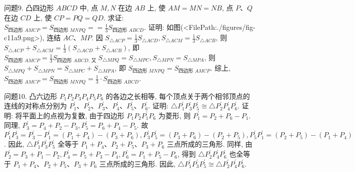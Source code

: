 问题9. 凸四边形 $A B C D$ 中, 点 $M, N$ 在边 $A B$ 上, 使 $A M=M N=N B$, 点 $P 、 Q$ 在边 $C D$ 上, 使 $C P=P Q=Q D$. 求证: $S_{\text {四边形 } A M C P}=S_{\text {四边形 } M N P Q}== \frac{1}{3} S_{\text {四边形 } A B C D}$.
证明: 如图(<FilePath:./figures/fig-c11a9.png>), 连结 $A C 、 M P$. 因 $S_{\triangle A C P}= \frac{1}{3} S_{\triangle A C D}, S_{\triangle A C M}=\frac{1}{3} S_{\triangle A C B}$, 则 $S_{\triangle A C P}+S_{\triangle A C M}= \frac{1}{3}\left(S_{\triangle A C D}+S_{\triangle A C B}\right)$, 即 $S_{\text {四边形 } A M C P}=\frac{1}{3} S_{\text {四边形 } A B C D \text {. 又 }} S_{\triangle M P Q}=S_{\triangle M P C}, S_{\triangle M P N}=S_{\triangle M P A}$, 则 $S_{\triangle M P Q}+S_{\triangle M P N}= S_{\triangle M P C}+S_{\triangle M P A}$, 即 $S_{\text {四边形 } M N P Q}=S_{\text {四边形 } A M C P}$. 综上,
$S_{\text {四边形 } A M C P}=S_{\text {四边形 } M N P Q}=\frac{1}{3} \cdot S_{\text {四边形 } A B C D}$.



问题10. 凸六边形 $P_1 P_2 P_3 P_4 P_5 P_6$ 的各边之长相等, 每个顶点关于两个相邻顶点的连线的对称点分别为 $P_1^{\prime} 、 P_2^{\prime} 、 P_3^{\prime} 、 P_4^{\prime} 、 P_5^{\prime} 、 P_6^{\prime}$. 证明: $\triangle P_1^{\prime} P_3^{\prime} P_5^{\prime} \cong \triangle P_2^{\prime} P_4^{\prime} P_6^{\prime}$.
证明: 将平面上的点视为复数, 由于四边形 $P_1 P_2 P_1^{\prime} P_6$ 为菱形, 则 $P_1^{\prime}=P_2+P_6-P_1$. 同理, $P_3^{\prime}=P_4+P_2-P_3, P_5^{\prime}=P_6+P_4-P_5$. 故 $P_1^{\prime} P_3^{\prime}= P_3^{\prime}-P_1^{\prime}=\left(P_1+P_4\right)-\left(P_3+P_6\right), P_3^{\prime} P_5^{\prime}=\left(P_3+P_6\right)-\left(P_2+P_5\right), P_5^{\prime} P_1^{\prime}= \left(P_2+P_5\right)-\left(P_1+P_4\right)$. 因此, $\triangle P_1^{\prime} P_3^{\prime} P_5^{\prime}$ 全等于 $P_1+P_4 、 P_2+P_5 、 P_3+P_6$ 三点所成的三角形.
同样, 由 $P_2^{\prime}=P_3+P_1-P_2, P_4^{\prime}=P_5+P_3-P_4, P_6^{\prime}= P_1+P_5-P_6$, 得到 $\triangle P_2^{\prime} P_4^{\prime} P_6^{\prime}$ 也全等于 $P_1+P_4 、 P_2+P_5 、 P_3+P_6$ 三点所成的三角形.
因此, $\triangle P_1^{\prime} P_3^{\prime} P_5^{\prime} \cong \triangle P_2^{\prime} P_4^{\prime} P_6^{\prime}$.



